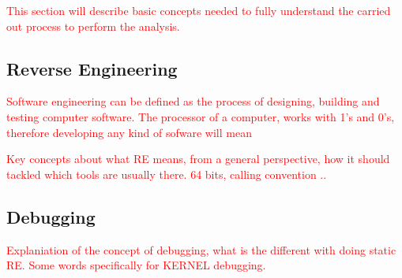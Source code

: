 \textcolor{red}{This section will describe basic concepts needed to fully understand the carried out process to perform the analysis.}
\subsection{Reverse Engineering}
\textcolor{red}{Software engineering can be defined as the process of designing, building and testing computer software. The processor of a computer, works with 1's and 0's, therefore developing any kind of sofware will mean }

\textcolor{red}{Key concepts about what RE means, from a general perspective, how it should tackled which tools are usually there.  64 bits, calling convention .. }
\subsection{Debugging}
\textcolor{red}{Explaniation of the concept of debugging, what is the different with doing static RE. Some words specifically for KERNEL debugging. }